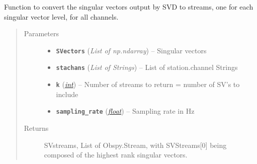 \documentclass[a4paper,10pt,english]{sphinxmanual}
\begin{document}
\begin{fulllineitems}
\label{utils:clustering.SVD_2_stream}
Function to convert the singular vectors output by SVD to streams, one for
each singular vector level, for all channels.
\begin{quote}\begin{description}
\item[{Parameters}] \leavevmode\begin{itemize}
\item {} 
\textbf{\texttt{SVectors}} (\emph{List of np.ndarray}) -- Singular vectors

\item {} 
\textbf{\texttt{stachans}} (\emph{List of Strings}) -- List of station.channel Strings

\item {} 
\textbf{\texttt{k}} (\href{https://docs.python.org/library/functions.html\#int}{\emph{int}}) -- Number of streams to return = number of SV's to include

\item {} 
\textbf{\texttt{sampling\_rate}} (\href{https://docs.python.org/library/functions.html\#float}{\emph{float}}) -- Sampling rate in Hz

\end{itemize}

\item[{Returns}] \leavevmode
SVstreams, List of Obspy.Stream, with SVStreams{[}0{]} being
composed of the highest rank singular vectors.

\end{description}\end{quote}

\end{fulllineitems}

\end{document}
